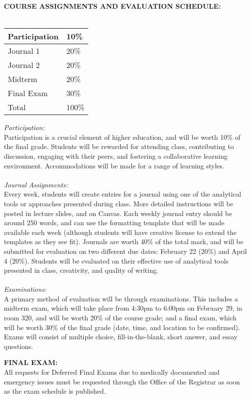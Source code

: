 \documentclass[10pt]{article}
\begin{document}
\textbf{COURSE ASSIGNMENTS AND EVALUATION SCHEDULE:}\\\\
{\renewcommand{\arraystretch}{1.2}
\begin{tabular}{|l|l|}\hline
	Participation & 10\% \\\hline
	Journal 1 & 20\% \\\hline
	Journal 2 & 20\% \\\hline
	Midterm & 20\% \\\hline
	Final Exam & 30\% \\\hline\hline
	Total & 100\% \\\hline
\end{tabular}
}

\textit{Participation:}\\ 
Participation is a crucial element of higher education, and will be worth 10\% of the final grade. Students will be rewarded for attending class, contributing to discussion, engaging with their peers, and fostering a collaborative learning environment. Accommodations will be made for a range of learning styles.\\\\
\textit{Journal Assignments:}\\
Every week, students will create entries for a journal using one of the analytical tools or approaches presented during class. More detailed instructions will be posted in lecture slides, and on Canvas. Each weekly journal entry should be around 250 words, and can use the formatting template that will be made available each week (although students will have creative license to extend the templates as they see fit). Journals are worth 40\% of the total mark, and will be submitted for evaluation on two different due dates: February 22 (20\%) and April 4 (20\%). Students will be evaluated on their effective use of analytical tools presented in class, creativity, and quality of writing.\\\\
\textit{Examinations:}\\ 
A primary method of evaluation will be through examinations. This includes a midterm exam, which will take place from 4:30pm to 6:00pm on February 29, in room 320, and will be worth 20\% of the course grade; and a final exam, which will be worth 30\% of the final grade (date, time, and location to be confirmed). Exams will consist of multiple choice, fill-in-the-blank, short answer, and essay questions. 

\textbf{FINAL EXAM:}\\
All requests for Deferred Final Exams due to medically documented and emergency issues must be requested through the Office of the Registrar as soon as the exam schedule is published.
\end{document}
